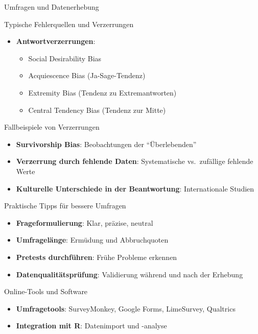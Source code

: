 \documentclass[
  ignorenonframetext,
]{beamer}
\providecommand{\tightlist}{%
  \setlength{\itemsep}{0pt}\setlength{\parskip}{0pt}}
\begin{document}
\begin{frame}{Umfragen und Datenerhebung}
\begin{block}{Typische Fehlerquellen und Verzerrungen}
\begin{itemize}
  \begin{itemize}
  \tightlist
  \item
    Convenience Sampling
  \item
    Self-Selection Bias
  \item
    Non-Response Bias
  \end{itemize}
\item
  \textbf{Antwortverzerrungen}:

  \begin{itemize}
  \tightlist
  \item
    Social Desirability Bias
  \item
    Acquiescence Bias (Ja-Sage-Tendenz)
  \item
    Extremity Bias (Tendenz zu Extremantworten)
  \item
    Central Tendency Bias (Tendenz zur Mitte)
  \end{itemize}
\end{itemize}
\end{block}

\begin{block}{Fallbeispiele von Verzerrungen}
\protect{}\label{fallbeispiele-von-verzerrungen}
\begin{itemize}
\tightlist
\item
  \textbf{Survivorship Bias}: Beobachtungen der ``Überlebenden''
\item
  \textbf{Verzerrung durch fehlende Daten}: Systematische vs.~zufällige
  fehlende Werte
\item
  \textbf{Kulturelle Unterschiede in der Beantwortung}: Internationale
  Studien
\end{itemize}
\end{block}

\begin{block}{Praktische Tipps für bessere Umfragen}
\protect{}\label{praktische-tipps-fuxfcr-bessere-umfragen}
\begin{itemize}
\tightlist
\item
  \textbf{Frageformulierung}: Klar, präzise, neutral
\item
  \textbf{Umfragelänge}: Ermüdung und Abbruchquoten
\item
  \textbf{Pretests durchführen}: Frühe Probleme erkennen
\item
  \textbf{Datenqualitätsprüfung}: Validierung während und nach der
  Erhebung
\end{itemize}
\end{block}

\begin{block}{Online-Tools und Software}
\protect{}\label{online-tools-und-software}
\begin{itemize}
\tightlist
\item
  \textbf{Umfragetools}: SurveyMonkey, Google Forms, LimeSurvey,
  Qualtrics
\item
  \textbf{Integration mit R}: Datenimport und -analyse
\end{itemize}
\end{block}
\end{frame}
\end{document}
